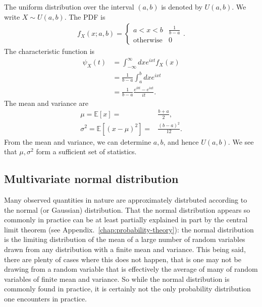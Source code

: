 The uniform distribution over the interval $\left(a,b\right)$ is denoted by $U\left(a,b\right)$. We write $X\sim U\left(a,b\right)$.
The PDF is
\begin{align}
    f_X\left(x;a,b\right)
    =
    \begin{cases}
        a<x<b & \frac{1}{b-a}
        \\
        \mathrm{otherwise} & 0
    \end{cases}
    .
\end{align}
The characteristic function is
\begin{align}
    \psi_{X}\left(t\right)
    &=
    \int_{-\infty}^{\infty}dx e^{ix t} f_{X}\left(x\right)
    \nonumber\\
    &=
    \frac{1}{b-a}\int_{a}^{b}dx e^{ix t}
    \nonumber\\
    &=
    \frac{1}{b-a} \frac{e^{ibt} - e^{iat}}{it}
    .
\end{align}
The mean and variance are
\begin{align}
    \mu
    =
    \mathbb{E}\left[x\right]
    =&
    \frac{b+a}{2}
    ,\\
    \sigma^2
    =
    \mathbb{E}\left[\left(x-\mu\right)^2\right]
    =&
    \frac{\left(b-a\right)^2}{12}
    .
\end{align}
From the mean and variance, we can determine $a,b$, and hence $U\left(a,b\right)$.
We see that $\mu,\sigma^2$ form a sufficient set of statistics.
\subsection{Multivariate normal distribution}
Many observed quantities in nature are approximately distrbuted according
to the normal (or Gaussian) distribution.
That the normal distribution appears so commonly in practice can be at least
partially explained in part by the central limit theorem
(see Appendix.~\ref{chap:probability-theory}): the normal distribution is the
limiting distribution
of the mean of a large number of random variables drawn from any distribution
with a finite mean and variance.
This being said, there are plenty of cases where this does not happen, 
that is one may not be drawing from a random variable that is effectively the average of many of random variables of finite mean and variance.
So while the normal distribution is commonly found in practice, it is certainly not the only probability distribution one encounters in practice. 

